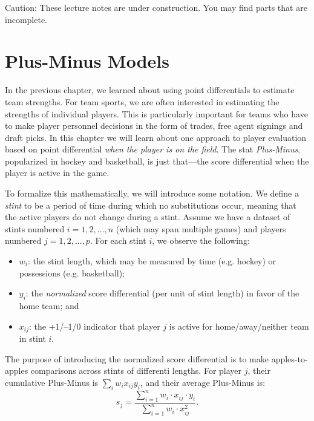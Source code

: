 \documentclass{article}
\begin{document}
  \begin{framed}
    {\sc Caution:} These lecture notes are under construction. You may find parts that are incomplete.
  \end{framed}

  \setcounter{section}{3}
  \section{\sc Plus-Minus Models}

  In the previous chapter, we learned about using point differentials to estimate team strengths. For team sports, we are often interested in estimating the strengths of individual players. This is particularly important for teams who have to make player personnel decisions in the form of trades, free agent signings and draft picks. In this chapter we will learn about one approach to player evaluation based on point differential {\it when the player is on the field}. The stat {\it Plus-Minus}, popularized in hockey and basketball, is just that---the score differential when the player is active in the game.
  
  To formalize this mathematically, we will introduce some notation. We define a {\it stint} to be a period of time during which no substitutions occur, meaning that the active players do not change during a stint. Assume we have a dataset of stints numbered $i = 1, 2, ..., n$ (which may span multiple games) and players numbered $j = 1, 2, ..., p$. For each stint $i$, we observe the following:
  \begin{itemize}
    \item $w_i$: the stint length, which may be measured by time (e.g. hockey) or possessions (e.g. basketball);
    \item $y_i$: the {\it normalized} score differential (per unit of stint length) in favor of the home team; and
    \item $x_{ij}$: the +1/--1/0 indicator that player $j$ is active for home/away/neither team in stint $i$.
  \end{itemize}
  The purpose of introducing the normalized score differential is to make apples-to-apples comparisons across stints of differenti lengths. For player $j$, their cumulative Plus-Minus is $\sum_i w_ix_{ij}y_i$, and their average Plus-Minus is:
  \begin{equation}
    \label{eqn-plus-minus}
    s_j = \frac{
      \sum_{i = 1}^n w_i \cdot x_{ij} \cdot y_i
    }{
      \sum_{i = 1}^n w_i \cdot x_{ij}^2
    }.
  \end{equation}
\end{document}
